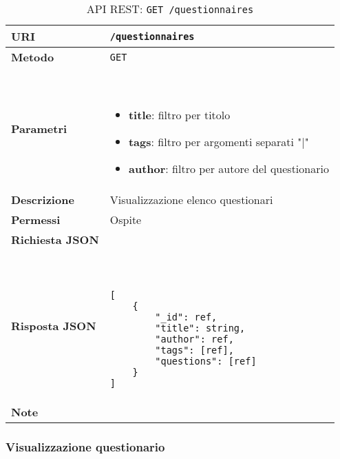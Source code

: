         \begin{table}[H]
            \begin{center}
                \begin{tabular}{p{} p{}}
                    \toprule
                    \textbf{URI} & \texttt{/questionnaires} \\ \midrule
                    \textbf{Metodo} & \texttt{GET} \\ \midrule
                    \textbf{Parametri} & \
                        \begin{itemize}
                            \item \textbf{title}: filtro per titolo
                            \item \textbf{tags}: filtro per argomenti separati "|" 
                            \item \textbf{author}: filtro per autore del questionario
                        \end{itemize}
                        \\ \midrule
                    \textbf{Descrizione} & Visualizzazione elenco questionari \\ \midrule
                    \textbf{Permessi} & Ospite \\ \midrule
                    \textbf{Richiesta JSON} & \\ \midrule
                    \textbf{Risposta JSON} & \
                        \begin{lstlisting}[basicstyle={\ttfamily}]
[
    {
        "_id": ref,
        "title": string,
        "author": ref,
        "tags": [ref],
        "questions": [ref] 
    }
]
                        \end{lstlisting}
                        \\ \midrule
                    \textbf{Note} & \\
                    \bottomrule
                \end{tabular}
                \caption{API REST: \texttt{GET /questionnaires}}
            \end{center}
        \end{table}

    \subsubsection{Visualizzazione questionario}

